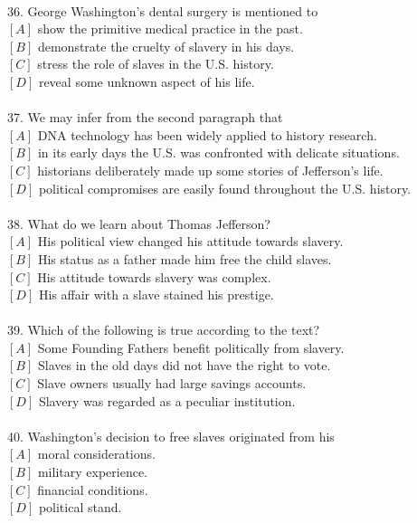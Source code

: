 \documentclass[a4paper]{ctexart}
\begin{document}
\\
36.	George Washington’s dental surgery is mentioned to\\
$[A]$ show the primitive medical practice in the past.\\
$[B]$ demonstrate the cruelty of slavery in his days.\\
$[C]$ stress the role of slaves in the U.S. history.\\
$[D]$ reveal some unknown aspect of his life.\\
\\
37.	We may infer from the second paragraph that\\
$[A]$ DNA technology has been widely applied to history research.\\
$[B]$ in its early days the U.S. was confronted with delicate situations.\\
$[C]$ historians deliberately made up some stories of Jefferson’s life.\\
$[D]$ political compromises are easily found throughout the U.S. history.\\
\\
38.	What do we learn about Thomas Jefferson?\\
$[A]$ His political view changed his attitude towards slavery.\\
$[B]$ His status as a father made him free the child slaves.\\
$[C]$ His attitude towards slavery was complex.\\
$[D]$ His affair with a slave stained his prestige.\\
\\
39.	Which of the following is true according to the text?\\
$[A]$ Some Founding Fathers benefit politically from slavery.\\
$[B]$ Slaves in the old days did not have the right to vote.\\
$[C]$ Slave owners usually had large savings accounts.\\
$[D]$ Slavery was regarded as a peculiar institution.\\
\\
40.	Washington’s decision to free slaves originated from his\\
$[A]$ moral considerations.\\
$[B]$ military experience.\\
$[C]$ financial conditions.\\
$[D]$ political stand.\\
\end{document}
